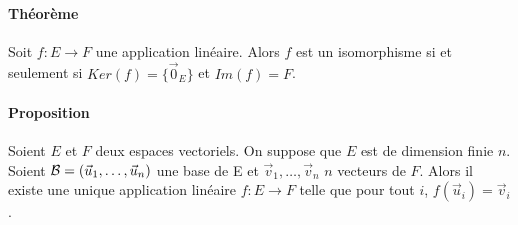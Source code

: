 \paragraph{Théorème} Soit $f: E \rightarrow F$  une application linéaire. Alors $f$ est un isomorphisme si et seulement si $Ker(f) = \{\vec{0}_E\}$ et $Im(f) = F$.

\paragraph{Proposition} Soient $E$ et $F$ deux espaces vectoriels. On suppose que $E$ est de dimension finie $n$. Soient $\mathcal{B} = (\vec{u}_1, \ldots, \vec{u}_n)$ une base de E et $\vec{v}_1, \ldots, \vec{v}_n$ $n$ vecteurs de $F$. Alors il existe une unique application linéaire $f: E \rightarrow F$ telle que pour tout $i$, $f(\vec{u}_i) = \vec{v}_i$.

